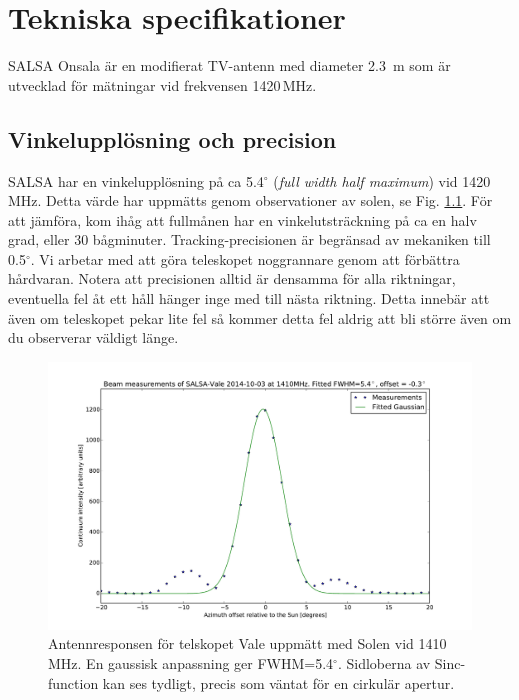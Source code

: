 \chapter{Tekniska specifikationer}
\label{chap:tech}
SALSA Onsala är en modifierat TV-antenn med diameter 2.3~m som är utvecklad
för mätningar vid frekvensen 1420\,MHz.

\section{Vinkelupplösning och precision}
\label{sect:ares}
SALSA har en vinkelupplösning på ca 5.4$^\circ$ (\emph{full width half
maximum}) vid 1420\,MHz. Detta värde har uppmätts genom observationer av solen,
se Fig. \ref{fig:beam}. För att jämföra, kom ihåg att fullmånen har en
vinkelutsträckning på ca en halv grad, eller 30 bågminuter. Tracking-precisionen
är begränsad av mekaniken till 0.5$^\circ$.  Vi arbetar med att göra teleskopet
noggrannare genom att förbättra hårdvaran. Notera att precisionen alltid är densamma
för alla riktningar, eventuella fel åt ett håll hänger inge med till nästa riktning.
Detta innebär att även om teleskopet pekar lite fel så kommer detta fel 
aldrig att bli större även om du observerar väldigt länge. 
\begin{figure}[ht]
\begin{center}
\includegraphics[width=\textwidth]{../figures/Beam_vale_2014-10-03.pdf}
\end{center}
\caption{Antennresponsen för telskopet Vale uppmätt med Solen vid 1410\,MHz. 
	En gaussisk anpassning ger FWHM=5.4$^\circ$. Sidloberna av Sinc-function 
	kan ses tydligt, precis som väntat för en cirkulär apertur. }
\label{fig:beam}
\end{figure}

